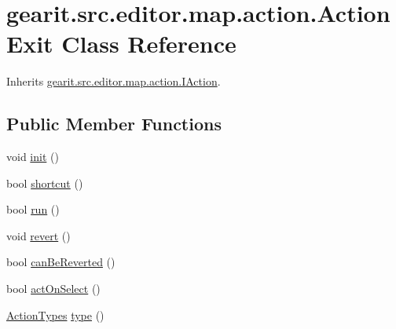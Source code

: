 \hypertarget{classgearit_1_1src_1_1editor_1_1map_1_1action_1_1_action_exit}{\section{gearit.\+src.\+editor.\+map.\+action.\+Action\+Exit Class Reference}
\label{classgearit_1_1src_1_1editor_1_1map_1_1action_1_1_action_exit}
}


Inherits \hyperlink{interfacegearit_1_1src_1_1editor_1_1map_1_1action_1_1_i_action}{gearit.\+src.\+editor.\+map.\+action.\+I\+Action}.

\subsection*{Public Member Functions}
\begin{DoxyCompactItemize}
\item 
void \hyperlink{classgearit_1_1src_1_1editor_1_1map_1_1action_1_1_action_exit_a6e01968b90741e380f6c9a03828ae630}{init} ()
\item 
bool \hyperlink{classgearit_1_1src_1_1editor_1_1map_1_1action_1_1_action_exit_a31374c1a5375886fc0af234a9b992e2d}{shortcut} ()
\item 
bool \hyperlink{classgearit_1_1src_1_1editor_1_1map_1_1action_1_1_action_exit_a8a8c31778b7a6a34023b1e5fb97622fb}{run} ()
\item 
void \hyperlink{classgearit_1_1src_1_1editor_1_1map_1_1action_1_1_action_exit_a64701250b57f4566e5e4d480da663d9a}{revert} ()
\item 
bool \hyperlink{classgearit_1_1src_1_1editor_1_1map_1_1action_1_1_action_exit_a1a69c96e6c6115f985f48950972f3ff7}{can\+Be\+Reverted} ()
\item 
bool \hyperlink{classgearit_1_1src_1_1editor_1_1map_1_1action_1_1_action_exit_a04d11503437208de1ccfd643bb048d5e}{act\+On\+Select} ()
\item 
\hyperlink{namespacegearit_1_1src_1_1editor_1_1map_1_1action_af036712a7d960b13d1e31954e65c00e3}{Action\+Types} \hyperlink{classgearit_1_1src_1_1editor_1_1map_1_1action_1_1_action_exit_a07bdb0cfe693da28fdc056519e5a9f14}{type} ()
\end{DoxyCompactItemize}


